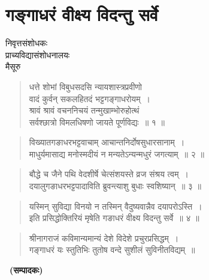 \chapter{गङ्गाधरं वीक्ष्य विदन्तु सर्वे}

\begin{center}
\smallskip

निवृत्तसंशोधकः\\ 
प्राच्यविद्यासंशोधनालयः\\  
मैसूरु
\end{center}

\begin{verse}
धत्ते शोभां विबुधसदसि न्यायशास्त्रप्रवीणो\\
वादं कुर्वन् सकलहितदं भट्टगङ्गाधरोयम्~।\\
श्रावं श्रावं वचननिचयं तन्मुखाम्भोरुहोत्थं\\
सर्वश्छात्रो विमलधिषणो जायते पूर्णविद्यः~॥ १ ॥
\end{verse}

\begin{verse}
विख्यातगङाधरभट्टवाचाम् आचान्तनिर्दोषसुधारसानाम्~।\\
माधुर्यमासाद्य मनोस्मदीयं न मन्यतेऽन्यन्मधुरं जगत्याम्~॥ २ ॥
\end{verse}

\begin{verse}
बौद्धे च जैने पथि वेदशीर्षे चेत्संशयस्ते व्रज संश्रय त्वम्~।\\
दयालुगङाधरभट्टपादाविति ब्रुवन्त्याशु बुधाः स्वशिष्यान्~॥ ३ ॥
\end{verse}

\begin{verse}
यस्मिन् सुविद्या विनयो न तस्मिन् वैदुष्यवान्नैव दयापरोऽस्ति~।\\
इति प्रसिद्धोक्तिरियं मृषेति गङाधरं वीक्ष्य विदन्तु सर्वे~॥ ४ ॥
\end{verse}

\begin{verse}
श्रीनागराजं कविमान्यमान्यं देशे विदेशे प्रचुरप्रसिद्धम्~।\\
गङ्गाधरं यः स्तुतिभिः तुतोष वन्दे सुशीलं सुविनीतविद्यम्~॥
\end{verse}

~\hfill\textbf{(सम्पादकः)}

